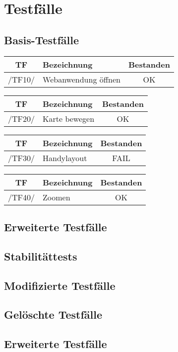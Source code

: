 \section{Testfälle}
\subsection{Basis-Testfälle}
\begin{center}
    \begin{tabular}[h]{|c|l|c|}
        \hline
        \textbf{TF} & \textbf{Bezeichnung} & \textbf{Bestanden} \\
        \hline
        /TF10/ & Webanwendung öffnen & \cellcolor{green!25}OK \\
        \hline
    \end{tabular}

\begin{tabular}[h]{|c|l|c|}
        \hline
        \textbf{TF} & \textbf{Bezeichnung} & \textbf{Bestanden} \\
        \hline
        /TF20/ & Karte bewegen & \cellcolor{green!25}OK \\
        \hline
    \end{tabular}

\begin{tabular}[h]{|c|l|c|}
        \hline
        \textbf{TF} & \textbf{Bezeichnung} & \textbf{Bestanden} \\
        \hline
        /TF30/ & Handylayout & \cellcolor{red!25}FAIL \\
        \hline
    \end{tabular}

\begin{tabular}[h]{|c|l|c|}
        \hline
        \textbf{TF} & \textbf{Bezeichnung} & \textbf{Bestanden} \\
        \hline
        /TF40/ & Zoomen & \cellcolor{green!25}OK \\
        \hline
    \end{tabular}
\end{center}

\subsection{Erweiterte Testfälle}
\subsection{Stabilitättests}

\subsection{Modifizierte Testfälle}

\subsection{Gelöschte Testfälle}

\subsection{Erweiterte Testfälle}




